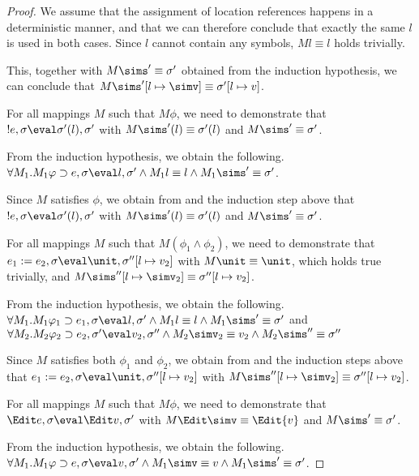 \begin{proof}
{  We assume that the assignment of location references happens in a deterministic manner, and that we can therefore conclude that exactly the same $l$ is used in both cases. Since $l$ cannot contain any symbols, $M l \equiv l$ holds trivially.

  This, together with $M \sims' \equiv{\sigma'}$ obtained from the induction hypothesis, we can conclude that $M\sims'[l\mapsto \simv]\equiv{\sigma'}[l\mapsto{v}]$.
  }

  {For all mappings $M$ such that $M\phi$, we need to demonstrate that $!e,\sigma\eval\sigma'(l),\sigma'$ with
  $M \sims'(l) \equiv {\sigma'}(l)$ and $M\sims'\equiv{\sigma'}$.

  From the induction hypothesis, we obtain the following.\\
  $\forall M_1 .  M_1\phi \implies e, \sigma {\eval}l,{\sigma'}\land  M_1l\equiv l \land  M_1\sims'\equiv{\sigma'}$.

  Since $M$ satisfies $\phi$,
  we obtain from  and the induction step above that $!e,\sigma {\eval}\sigma'(l),{\sigma'}$ with $M \sims'(l) \equiv {\sigma'}(l)$
  and $M\sims'\equiv{\sigma'}$.
}

  {
  For all mappings $M$ such that $M(\phi_1\wedge \phi_2)$,
  we need to demonstrate that\\
  $e_1 := e_2,\sigma\eval\unit,\sigma''[l\mapsto v_2]$ with
  $M\unit \equiv \unit$, which holds true trivially,
  and $M\sims''[l\mapsto \simv_2]\equiv{\sigma''}[l\mapsto{v_2}]$.

  From the induction hypothesis, we obtain the following.\\
  $\forall M_1 .  M_1\phi_1 \implies e_1, \sigma {\eval}l,{\sigma'}\land  M_1 l\equiv l \land  M_1\sims'\equiv{\sigma'}$ and
  $\forall M_2 . M_2\phi_2 \implies e_2,\sigma' {\eval}{v_2},{\sigma''}\land M_2\simv_2\equiv {v_2} \land M_2\sims''\equiv{\sigma''}$

  Since $M$ satisfies both $\phi_1$ and $\phi_2$, we obtain from  and the induction steps above that $e_1 := e_2,\sigma\eval\unit,\sigma''[l\mapsto v_2]$ with $M\sims''[l\mapsto \simv_2]\equiv{\sigma''}[l\mapsto{v_2}]$.
  }

  {For all mappings $M$ such that $M\phi$,
  we need to demonstrate that $\Edit e,\sigma\eval\Edit v,\sigma'$ with
  $M \Edit \simv \equiv \Edit {v}$ and $M\sims'\equiv{\sigma'}$.

  From the induction hypothesis, we obtain the following.
  $\forall M_1 .  M_1\phi \implies e, \sigma {\eval}{v},{\sigma'}\land  M_1\simv\equiv {v} \land  M_1\sims'\equiv{\sigma'}$.

}
\end{proof}
